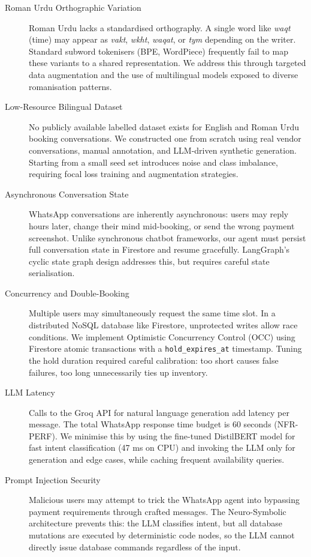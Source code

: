 \begin{description}
  \item[Roman Urdu Orthographic Variation]
        Roman Urdu lacks a standardised orthography. A single word like
        \textit{waqt} (time) may appear as \textit{vakt}, \textit{wkht},
        \textit{waqat}, or \textit{tym} depending on the writer. Standard subword
        tokenisers (BPE, WordPiece) frequently fail to map these variants to a
        shared representation. We address this through targeted data augmentation
        and the use of multilingual models exposed to diverse romanisation patterns.

  \item[Low-Resource Bilingual Dataset]
        No publicly available labelled dataset exists for English and Roman Urdu
        booking conversations. We constructed one from scratch using real vendor
        conversations, manual annotation, and LLM-driven synthetic generation.
        Starting from a small seed set introduces noise and class imbalance,
        requiring focal loss training and augmentation strategies.

  \item[Asynchronous Conversation State]
        WhatsApp conversations are inherently asynchronous: users may reply hours
        later, change their mind mid-booking, or send the wrong payment
        screenshot. Unlike synchronous chatbot frameworks, our agent must persist
        full conversation state in Firestore and resume gracefully. LangGraph's
        cyclic state graph design addresses this, but requires careful state
        serialisation.

  \item[Concurrency and Double-Booking]
        Multiple users may simultaneously request the same time slot. In a
        distributed NoSQL database like Firestore, unprotected writes allow race
        conditions. We implement Optimistic Concurrency Control (OCC) using
        Firestore atomic transactions with a \texttt{hold\_expires\_at}
        timestamp. Tuning the hold duration required careful calibration: too
        short causes false failures, too long unnecessarily ties up inventory.

  \item[LLM Latency]
        Calls to the Groq API for natural language generation add latency per
        message. The total WhatsApp response time budget is 60 seconds
        (NFR-PERF). We minimise this by using the fine-tuned DistilBERT model
        for fast intent classification (47 ms on CPU) and invoking the LLM only
        for generation and edge cases, while caching frequent availability
        queries.

  \item[Prompt Injection Security]
        Malicious users may attempt to trick the WhatsApp agent into bypassing
        payment requirements through crafted messages. The Neuro-Symbolic
        architecture prevents this: the LLM classifies intent, but all database
        mutations are executed by deterministic code nodes, so the LLM cannot
        directly issue database commands regardless of the input.
\end{description}

